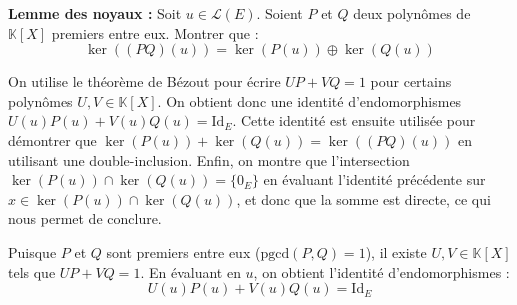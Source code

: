 \documentclass[11pt, a4paper]{article}
\theoremstyle{definition}
\begin{document}
\clearpage

\begin{tcolorbox}[instructionstyle]
	\textbf{Lemme des noyaux :} Soit $u \in \mathcal L(E)$. Soient $P$ et $Q$ deux polynômes de $\mathbb K[X]$ premiers entre eux. Montrer que :
	$$\ker((PQ)(u)) = \ker(P(u)) \oplus \ker(Q(u))$$
\end{tcolorbox}

\begin{tcolorbox}[methodstyle]
	On utilise le théorème de Bézout pour écrire $UP + VQ = 1$ pour certains polynômes $U, V \in \mathbb K[X]$. On obtient donc une identité d'endomorphismes $U(u)P(u) + V(u)Q(u) = \mathrm{Id}_E$. Cette identité est ensuite utilisée pour démontrer que $\ker(P(u)) + \ker(Q(u)) = \ker((PQ)(u))$ en utilisant une double-inclusion. Enfin, on montre que l'intersection $\ker(P(u)) \cap \ker(Q(u)) = \{0_E\}$ en évaluant l'identité précédente sur $x \in \ker(P(u)) \cap \ker(Q(u))$, et donc que la somme est directe, ce qui nous permet de conclure.
\end{tcolorbox}

Puisque $P$ et $Q$ sont premiers entre eux ($\mathrm{pgcd}(P,Q) = 1$), il existe $U,V \in \mathbb K[X]$ tels que $UP + VQ = 1$. En évaluant en $u$, on obtient l'identité d'endomorphismes :
$$U(u)P(u) + V(u)Q(u) = \mathrm{Id}_E$$
\end{document}
